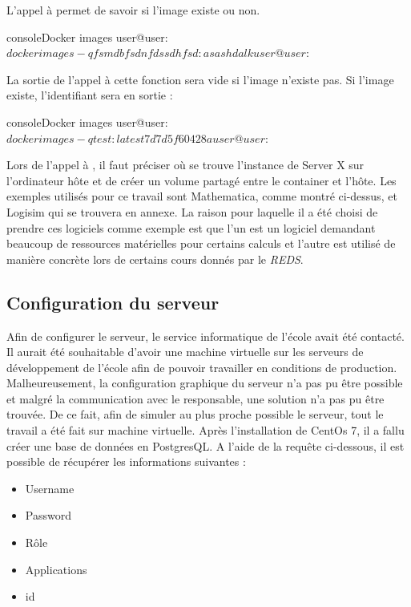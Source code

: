 
L'appel à  permet de savoir si l'image existe ou non.
\begin{listingsbox}{console}{Docker images}
user@user:~$ docker images -q fsmdbfsdnfdssdhfsd:asashdalk
user@user:~$
\end{listingsbox}
La sortie de l'appel à cette fonction sera vide si l'image n'existe pas.
\newline
Si l'image existe, l'identifiant sera en sortie :


\begin{listingsbox}{console}{Docker images}
user@user:~$ docker images -q test:latest
7d7d5f60428a
user@user:~$
\end{listingsbox}

Lors de l'appel à , il faut préciser où se trouve l'instance de Server X sur l'ordinateur hôte et de créer un volume partagé entre le container et l'hôte.
\newline
Les exemples utilisés pour ce travail sont Mathematica, comme montré ci-dessus, et Logisim qui se trouvera en annexe.
La raison pour laquelle il a été choisi de prendre ces logiciels comme exemple est que l'un est un logiciel demandant beaucoup de ressources matérielles pour certains calculs et l'autre est utilisé de manière concrète lors de certains cours donnés par le \textit{REDS}.


\subsection{Configuration du serveur}

Afin de configurer le serveur, le service informatique de l'école avait été contacté. 
Il aurait été souhaitable d'avoir une machine virtuelle sur les serveurs de développement de l'école afin de pouvoir travailler en conditions de production.
Malheureusement, la configuration graphique du serveur n'a pas pu être possible et malgré la communication avec le responsable, une solution n'a pas pu être trouvée.
\newline
De ce fait, afin de simuler au plus proche possible le serveur, tout le travail a été fait sur machine virtuelle.
Après l'installation de CentOs 7, il a fallu créer une base de données en PostgresQL.
A l'aide de la requête ci-dessous, il est possible de récupérer les informations suivantes : 
\begin{itemize}
	\item Username
	\item Password
	\item Rôle
	\item Applications
	\item id
\end{itemize}

